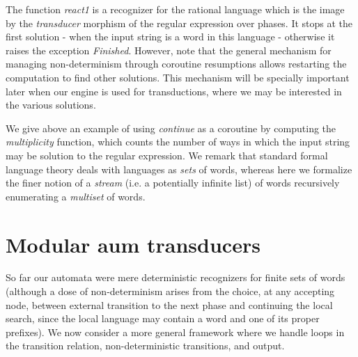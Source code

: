 The function {\sl react1} is a recognizer for the rational language which is the 
image by the {\sl transducer} morphism of the regular expression over phases. 
It stops at the first solution - when the input string is a word in this language 
- otherwise it raises the exception {\sl Finished}. However, note that the 
general mechanism for managing non-determinism through coroutine resumptions 
allows restarting the computation to find other solutions. This mechanism will 
be specially important later when our engine
is used for transductions, where we may be interested in the various solutions.

We give above an example of using {\sl continue} as a coroutine by computing 
the {\sl multiplicity} function, which counts the number of ways in which 
the input string may be solution to the regular expression. We remark that 
standard formal language theory deals with languages as {\sl sets} of words,
whereas here we formalize the finer notion of a {\sl stream} (i.e. a 
potentially infinite list) of words recursively enumerating a {\sl multiset}
of words. 



\section{Modular aum transducers}

So far our automata were mere deterministic recognizers for finite sets of words
(although a dose of non-determinism arises from the choice, at any accepting node,
between external transition to the next phase and continuing the local search, since
the local language may contain a word and one of its proper prefixes). 
We now consider a more general framework where we handle loops in the transition 
relation, non-deterministic transitions, and output.


